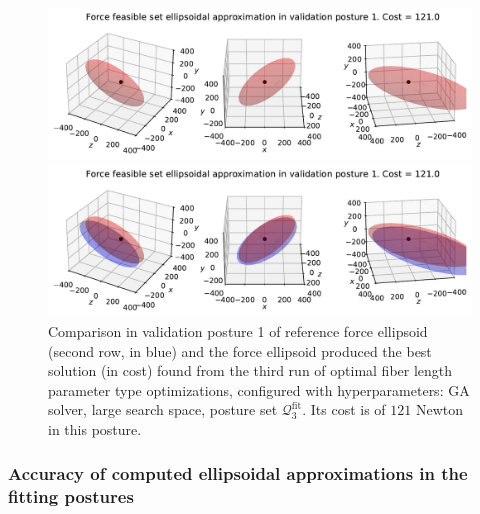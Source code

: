 \begin{figure}[!htb]
    \centering
    \captionsetup{justification=centering}
    
    \begin{minipage}{0.8\linewidth}
        \captionsetup{justification=centering}
        \centering
        \includegraphics[trim={0 0 0 0}, clip, width=1\linewidth]{img/chapter_4/reconstruction_stanford_imgs/ellipsoid_genetic_p3_opt_large_output_3215011_trial_3_val_posture_1.pdf}
    \end{minipage}
    \begin{minipage}{0.8\linewidth}
        \captionsetup{justification=centering}
        \centering
        \includegraphics[trim={0 0 0 20}, clip, width=1\linewidth]{img/chapter_4/reconstruction_stanford_imgs/ellipsoid_genetic_p3_opt_large_output_3215011_trial_3_val_posture_1_with_stanford.pdf}
    \end{minipage}
    \caption{Comparison in validation posture 1 of reference force ellipsoid (second row, in blue) and the force ellipsoid produced the best solution (in cost) found from the third run of optimal fiber length parameter type optimizations, configured with hyperparameters: GA solver, large search space, posture set $\mathcal{Q}_3^{\text{fit}}$. Its cost is of $121$ Newton in this posture.}
    \label{fig:ellipsoid_genetic_p3_opt_large_output_3215011_trial_3_val_posture_1}
\end{figure}

\clearpage

\subsubsection*{Accuracy of computed ellipsoidal approximations in the fitting postures}

